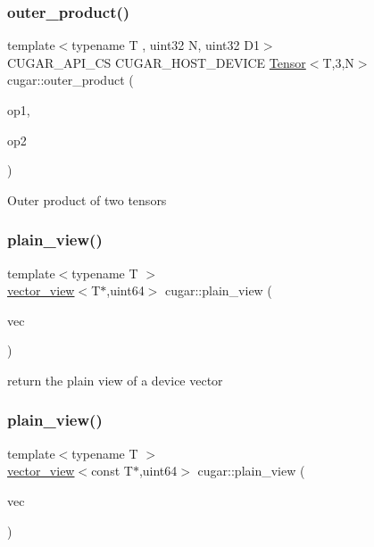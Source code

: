 \subsubsection{\texorpdfstring{outer\+\_\+product()}{outer\_product()}\hspace{0.1cm}{\footnotesize\ttfamily [9/9]}}
{\footnotesize\ttfamily template$<$typename T , uint32 N, uint32 D1$>$ \\
C\+U\+G\+A\+R\+\_\+\+A\+P\+I\+\_\+\+CS C\+U\+G\+A\+R\+\_\+\+H\+O\+S\+T\+\_\+\+D\+E\+V\+I\+CE \hyperlink{structcugar_1_1_tensor}{Tensor}$<$T,3,N$>$ cugar\+::outer\+\_\+product (\begin{DoxyParamCaption}\item[{const \hyperlink{structcugar_1_1_tensor}{Tensor}$<$ T, D1, N $>$}]{op1,  }\item[{const \hyperlink{structcugar_1_1_tensor}{Tensor}$<$ T, 1, N $>$}]{op2 }\end{DoxyParamCaption})}

Outer product of two tensors \mbox{\label{namespacecugar_a347f91de482f0cb8dcba21c086b0aa46}} 
\subsubsection{\texorpdfstring{plain\+\_\+view()}{plain\_view()}\hspace{0.1cm}{\footnotesize\ttfamily [1/4]}}
{\footnotesize\ttfamily template$<$typename T $>$ \\
\hyperlink{structcugar_1_1vector__view}{vector\+\_\+view}$<$T$\ast$,uint64$>$ cugar\+::plain\+\_\+view (\begin{DoxyParamCaption}\item[{thrust\+::device\+\_\+vector$<$ T $>$ \&}]{vec }\end{DoxyParamCaption})}

return the plain view of a device vector \mbox{\label{namespacecugar_a86cf54788cfd00efc24da9269d9b1a04}} 
\subsubsection{\texorpdfstring{plain\+\_\+view()}{plain\_view()}\hspace{0.1cm}{\footnotesize\ttfamily [2/4]}}
{\footnotesize\ttfamily template$<$typename T $>$ \\
\hyperlink{structcugar_1_1vector__view}{vector\+\_\+view}$<$const T$\ast$,uint64$>$ cugar\+::plain\+\_\+view (\begin{DoxyParamCaption}\item[{const thrust\+::device\+\_\+vector$<$ T $>$ \&}]{vec }\end{DoxyParamCaption})}

